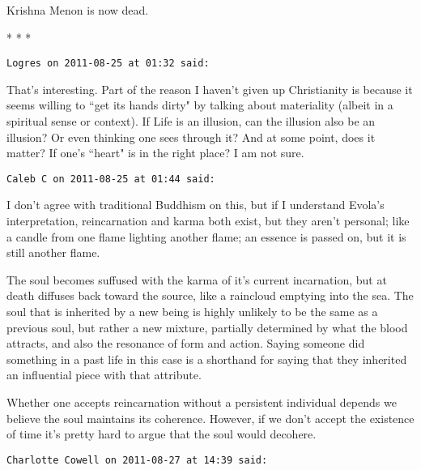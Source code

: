 Krishna Menon is now dead.




\begin{center}* * *\end{center}

\begin{footnotesize}\begin{sffamily}



\texttt{Logres on 2011-08-25 at 01:32 said: }

That's interesting. Part of the reason I haven't given up Christianity is because it seems willing to ``get its hands dirty" by talking about materiality (albeit in a spiritual sense or context). If Life is an illusion, can the illusion also be an illusion? Or even thinking one sees through it? And at some point, does it matter? If one's ``heart" is in the right place? I am not sure.


\hfill

\texttt{Caleb C on 2011-08-25 at 01:44 said: }

I don't agree with traditional Buddhism on this, but if I understand Evola's interpretation, reincarnation and karma both exist, but they aren't personal; like a candle from one flame lighting another flame; an essence is passed on, but it is still another flame. 

The soul becomes suffused with the karma of it's current incarnation, but at death diffuses back toward the source, like a raincloud emptying into the sea. The soul that is inherited by a new being is highly unlikely to be the same as a previous soul, but rather a new mixture, partially determined by what the blood attracts, and also the resonance of form and action. Saying someone did something in a past life in this case is a shorthand for saying that they inherited an influential piece with that attribute.

Whether one accepts reincarnation without a persistent individual depends we believe the soul maintains its coherence. However, if we don't accept the existence of time it's pretty hard to argue that the soul would decohere.


\hfill

\texttt{Charlotte Cowell on 2011-08-27 at 14:39 said: }


\end{sffamily}
\end{footnotesize}
